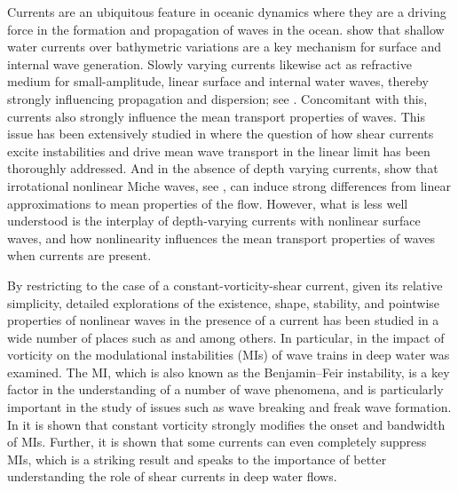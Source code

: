 \documentclass{JFM_Style/jfm}
\begin{document}
Currents are an ubiquitous feature in oceanic dynamics where they are a driving force in the formation and propagation of waves in the ocean.  \cite{helfrich} show that shallow water currents over bathymetric variations are a key mechanism for surface and internal wave generation.  Slowly varying currents likewise act as refractive medium for small-amplitude, linear surface and internal water waves, thereby strongly influencing propagation and dispersion; see \cite{mcwilliams,buhler,young}.  Concomitant with this, currents also strongly influence the mean transport properties of waves.  This issue has been extensively studied in \cite{craik1,craik2,craik3,craik4,phillips1,phillips2} where the question of how shear currents excite instabilities and drive mean wave transport in the linear limit has been thoroughly addressed.  And in the absence of depth varying currents, \cite{ardhuin} show that irrotational nonlinear Miche waves, see \cite{miche}, can induce strong differences from linear approximations to mean properties of the flow.  However, what is less well understood is the interplay of depth-varying currents with nonlinear surface waves, and how nonlinearity influences the mean transport properties of waves when currents are present.

By restricting to the case of a constant-vorticity-shear current, given its relative simplicity, detailed explorations of the existence, shape, stability, and pointwise properties of nonlinear waves in the presence of a current has been studied in a wide number of places such as \cite{freeman,brevik,simmen,pullin2,pullin3,dasilva,baumstein,choi,wahlen,wahlen2,constantin,thomas2012nonlinear,vasan2014pressure} and \cite{nachbin} among others. In particular, in \cite{thomas2012nonlinear} the impact of vorticity on the modulational instabilities (MIs) of wave trains in deep water was examined.  The MI, which is also known as the Benjamin--Feir instability, is a key factor in the understanding of a number of wave phenomena, and is particularly important in the study of issues such as wave breaking and freak wave formation.  In \cite{thomas2012nonlinear} it is shown that constant vorticity strongly modifies the onset and bandwidth of MIs. Further, it is shown that some currents can even completely suppress MIs, which is a striking result and speaks to the importance of better understanding the role of shear currents in deep water flows.
\end{document}
